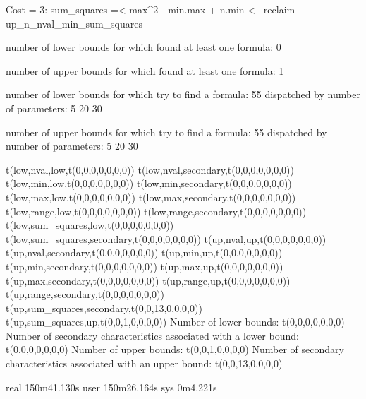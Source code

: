Cost =  3:  sum_squares =< max^2 - min.max + n.min
<-- reclaim up_n_nval_min_sum_squares

number of lower bounds for which found at least one formula: 0

number of upper bounds for which found at least one formula: 1

number of lower bounds for which try to find a formula: 55
dispatched by number of parameters: 5  20  30

number of upper bounds for which try to find a formula: 55
dispatched by number of parameters: 5  20  30

t(low,nval,low,t(0,0,0,0,0,0,0))
t(low,nval,secondary,t(0,0,0,0,0,0,0))
t(low,min,low,t(0,0,0,0,0,0,0))
t(low,min,secondary,t(0,0,0,0,0,0,0))
t(low,max,low,t(0,0,0,0,0,0,0))
t(low,max,secondary,t(0,0,0,0,0,0,0))
t(low,range,low,t(0,0,0,0,0,0,0))
t(low,range,secondary,t(0,0,0,0,0,0,0))
t(low,sum_squares,low,t(0,0,0,0,0,0,0))
t(low,sum_squares,secondary,t(0,0,0,0,0,0,0))
t(up,nval,up,t(0,0,0,0,0,0,0))
t(up,nval,secondary,t(0,0,0,0,0,0,0))
t(up,min,up,t(0,0,0,0,0,0,0))
t(up,min,secondary,t(0,0,0,0,0,0,0))
t(up,max,up,t(0,0,0,0,0,0,0))
t(up,max,secondary,t(0,0,0,0,0,0,0))
t(up,range,up,t(0,0,0,0,0,0,0))
t(up,range,secondary,t(0,0,0,0,0,0,0))
t(up,sum_squares,secondary,t(0,0,13,0,0,0,0))
t(up,sum_squares,up,t(0,0,1,0,0,0,0))
Number of lower bounds:                                             t(0,0,0,0,0,0,0)
Number of secondary characteristics associated with a lower bound:  t(0,0,0,0,0,0,0)
Number of upper bounds:                                             t(0,0,1,0,0,0,0)
Number of secondary characteristics associated with an upper bound: t(0,0,13,0,0,0,0)

real	150m41.130s
user	150m26.164s
sys	0m4.221s

